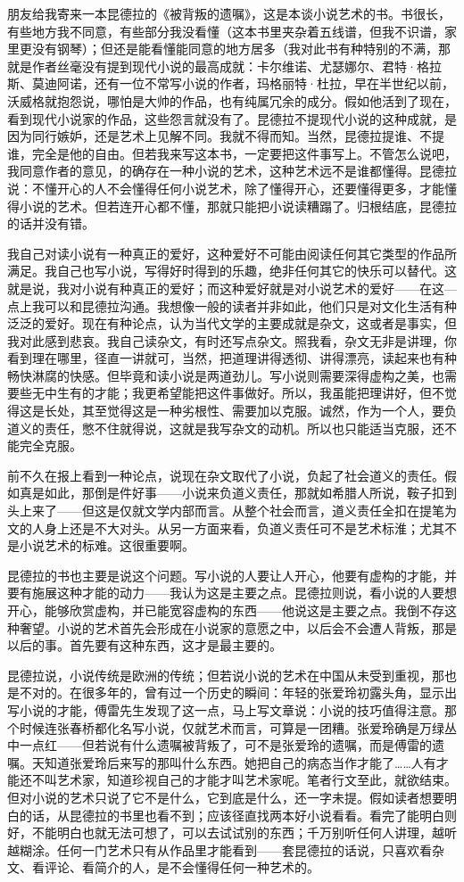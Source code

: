 朋友给我寄来一本昆德拉的《被背叛的遗嘱》，这是本谈小说艺术的书。书很长，有些地方我不同意，有些部分我没看懂（这本书里夹杂着五线谱，但我不识谱，家里更没有钢琴）；但还是能看懂能同意的地方居多（我对此书有种特别的不满，那就是作者丝毫没有提到现代小说的最高成就：卡尔维诺、尤瑟娜尔、君特·格拉斯、莫迪阿诺，还有一位不常写小说的作者，玛格丽特·杜拉，早在半世纪以前，沃威格就抱怨说，哪怕是大帅的作品，也有纯属冗余的成分。假如他活到了现在，看到现代小说家的作品，这些怨言就没有了。昆德拉不提现代小说的这种成就，是因为同行嫉妒，还是艺术上见解不同。我就不得而知。当然，昆德拉提谁、不提谁，完全是他的自由。但若我来写这本书，一定要把这件事写上。不管怎么说吧，我同意作者的意见，的确存在一种小说的艺术，这种艺术远不是谁都懂得。昆德拉说：不懂开心的人不会懂得任何小说艺术，除了懂得开心，还要懂得更多，才能懂得小说的艺术。但若连开心都不懂，那就只能把小说读糟蹋了。归根结底，昆德拉的话并没有错。 

我自己对读小说有一种真正的爱好，这种爱好不可能由阅读任何其它类型的作品所满足。我自己也写小说，写得好时得到的乐趣，绝非任何其它的快乐可以替代。这就是说，我对小说有种真正的爱好；而这种爱好就是对小说艺术的爱好——在这—点上我可以和昆德拉沟通。我想像一般的读者并非如此，他们只是对文化生活有种泛泛的爱好。现在有种论点，认为当代文学的主要成就是杂文，这或者是事实，但我对此感到悲哀。我自己读杂文，有时还写点杂文。照我看，杂文无非是讲理，你看到理在哪里，径直一讲就可，当然，把道理讲得透彻、讲得漂亮，读起来也有种畅快淋腐的快感。但毕竟和读小说是两道劲儿。写小说则需要深得虚构之美，也需要些无中生有的才能；我更希望能把这件事做好。所以，我虽能把理讲好，但不觉得这是长处，其至觉得这是一种劣根性、需要加以克服。诚然，作为一个人，要负道义的责任，憋不住就得说，这就是我写杂文的动机。所以也只能适当克服，还不能完全克服。 

前不久在报上看到一种论点，说现在杂文取代了小说，负起了社会道义的责任。假如真是如此，那倒是件好事——小说来负道义责任，那就如希腊人所说，鞍子扣到头上来了——但这是仅就文学内部而言。从整个社会而言，道义责任全扣在提笔为文的人身上还是不大对头。从另一方面来看，负道义责任可不是艺术标淮；尤其不是小说艺术的标难。这很重要啊。 

昆德拉的书也主要是说这个问题。写小说的人要让人开心，他要有虚构的才能，并要有施展这种才能的动力——我认为这是主要之点。昆德拉则说，看小说的人要想开心，能够欣赏虚构，并已能宽容虚构的东西——他说这是主要之点。我倒不存这种奢望。小说的艺术首先会形成在小说家的意愿之中，以后会不会遭人背叛，那是以后的事。首先要有这种东西，这才是最主要的。 

昆德拉说，小说传统是欧洲的传统；但若说小说的艺术在中国从未受到重视，那也是不对的。在很多年的，曾有过一个历史的瞬间：年轻的张爱玲初露头角，显示出写小说的才能，傅雷先生发现了这一点，马上写文章说：小说的技巧值得注意。那个时候连张春桥都化名写小说，仅就艺术而言，可算是一团糟。张爱玲确是万绿丛中一点红——但若说有什么遗嘱被背叛了，可不是张爱玲的遗嘱，而是傅雷的遗嘱。天知道张爱玲后来写的那叫什么东西。她把自己的病态当作才能了……人有才能还不叫艺术家，知道珍视自己的才能才叫艺术家呢。笔者行文至此，就欲结束。但对小说的艺术只说了它不是什么，它到底是什么，还一字未提。假如读者想要明白的话，从昆德拉的书里也看不到；应该径直找两本好小说看看。看完了能明白则好，不能明白也就无法可想了，可以去试试别的东西；千万别听任何人讲理，越听越糊涂。任何一门艺术只有从作品里才能看到——套昆德拉的话说，只喜欢看杂文、看评论、看简介的人，是不会懂得任何一种艺术的。

